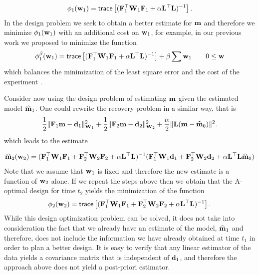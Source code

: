 \documentclass[english]{siamltex}
\newcommand{\bfF}	{{\bf{F}}}
\newcommand{\bfL}	{{\bf{L}}}
\newcommand{\bfW}	{{\bf{W}}}
\newcommand{\bfd}	{{\bf{d}}}
\newcommand{\bfm}	{{\bf{m}}}
\newcommand{\bfw}	{{\bf{w}}}
\newcommand{\hf}        {{\frac 12}}
\newcommand{\bfmhat}    {{\widehat{\bfm}}}
\newcommand{\LtL}       { \bfL^{\top}\bfL}
\renewcommand{\hf}		 {\frac12}
\renewcommand{\bfmhat}	{\widehat{\bf m}}
\begin{document}
{\begin{eqnarray}
\label{design1}
\phi_{1}(\bfw_1 ) =  {\sf trace} \left[   (\bfF_{1}^{\top}\bfW_{1}\bfF_{1}   + 
 {\alpha} \LtL)^{-1} \right]. 
\end{eqnarray}
In the design problem we seek to obtain a better estimate for $\bfm$ and therefore
we minimize $\phi_{1}(\bfw_{1})$ with an additional cost on $\bfw_{1}$, for example, in our
previous work we proposed to minimize the function
\begin{eqnarray}
\label{designp1}
\phi_{1}^{\beta}(\bfw_1 ) =  {\sf trace} \left[   (\bfF_{1}^{\top}\bfW_{1}\bfF_{1}   + 
 {\alpha} \LtL)^{-1} \right]  + \beta \sum \bfw_{1} \quad \quad 0 \le \bfw 
\end{eqnarray}
which balances the minimization of the least square error and the cost of the experiment \cite{habera}.


\bigskip

Consider now using the design problem of estimating $\bfm$ given the estimated model $\widehat \bfm_{1}$.
One could rewrite the recovery problem in a similar way, that is
\begin{eqnarray}
\label{mest2}
\hf \| \bfF_{1} \bfm - \bfd_{1}\|^{2}_{\bfW_{1}} + \hf \| \bfF_{2} \bfm - \bfd_{2}\|^{2}_{\bfW_{2}}  + {\frac {\alpha} 2}
\|\bfL (\bfm -\bfmhat_{0}) \|^{2}. 
\end{eqnarray}
which leads to the estimate

\begin{eqnarray}
\label{mest2}
\bfmhat_{2}(\bfw_{2}) = (\bfF_{1}^{\top} \bfW_{1}\bfF_{1} +
\bfF_{2}^{\top} \bfW_{2}\bfF_{2} + \alpha \LtL)^{-1} (\bfF_{1}^{\top} \bfW_{1} \bfd_{1} +\bfF_{2}^{\top} \bfW_{2} \bfd_{2}
+ \alpha \LtL \bfmhat_{0})
\end{eqnarray}
Note that we assume that $\bfw_{1}$ is fixed and therefore the new estimate is a function of $\bfw_{2}$ alone.
If we repeat the steps above then we obtain that the A-optimal design for time $t_{2}$ yields the minimization of
the function
\begin{eqnarray}
\label{design2na}
\phi_{2}(\bfw_{2} ) =  {\sf trace} \left[   (\bfF_{1}^{\top}\bfW_{1}\bfF_{1}   + \bfF_{2}^{\top}\bfW_{2}\bfF_{2} +
\alpha \LtL)^{-1} \right]. 
\end{eqnarray}
While this design optimization problem can be solved, it does not take into consideration the fact that 
we already  have an estimate of the model, $\bfmhat_{1}$ and therefore, does not include the 
information we have already obtained at time $t_{1}$ in order to plan a better design.
It is easy to verify that any linear estimator of the data yields a covariance matrix that is independent of $\bfd_{1}$,
and therefore the approach above does not yield a post-priori estimator.


}
\end{document}
